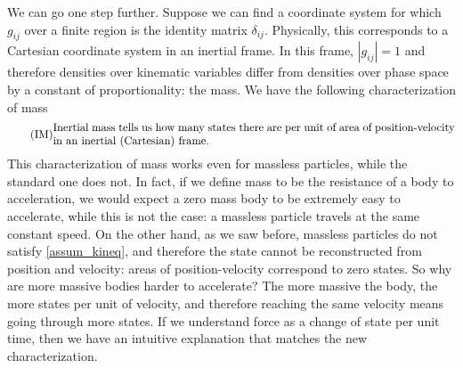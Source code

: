 We can go one step further. Suppose we can find a coordinate system for which $g_{ij}$ over a finite region is the identity matrix $\delta_{ij}$. Physically, this corresponds to a Cartesian coordinate system in an inertial frame. In this frame, $|g_{ij}| = 1$ and therefore densities over kinematic variables differ from densities over phase space by a constant of proportionality: the mass. We have the following characterization of mass
\begin{equation}
	\tag{IM}
	\parbox{5in}{Inertial mass tells us how many states there are per unit of area of position-velocity in an inertial (Cartesian) frame.}
\end{equation}
This characterization of mass works even for massless particles, while the standard one does not. In fact, if we define mass to be the resistance of a body to acceleration, we would expect a zero mass body to be extremely easy to accelerate, while this is not the case: a massless particle travels at the same constant speed. On the other hand, as we saw before, massless particles do not satisfy \ref{assum_kineq}, and therefore the state cannot be reconstructed from position and velocity: areas of position-velocity correspond to zero states. So why are more massive bodies harder to accelerate? The more massive the body, the more states per unit of velocity, and therefore reaching the same velocity means going through more states. If we understand force as a change of state per unit time, then we have an intuitive explanation that matches the new characterization.


